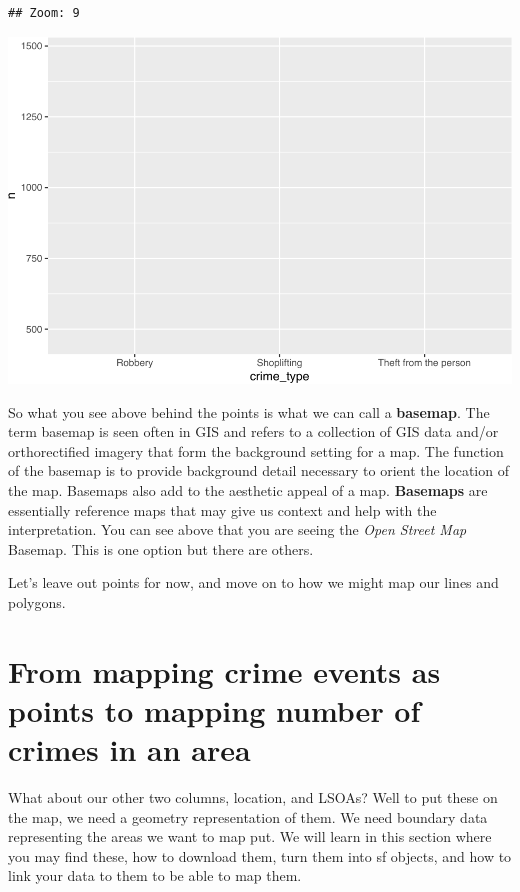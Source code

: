 \documentclass[
]{book}
\begin{document}
\begin{verbatim}
## Zoom: 9
\end{verbatim}

\includegraphics{crime_mapping_files/figure-latex/unnamed-chunk-8-1.pdf}

So what you see above behind the points is what we can call a \textbf{basemap}. The term basemap is seen often in GIS and refers to a collection of GIS data and/or orthorectified imagery that form the background setting for a map. The function of the basemap is to provide background detail necessary to orient the location of the map. Basemaps also add to the aesthetic appeal of a map. \textbf{Basemaps} are essentially reference maps that may give us context and help with the interpretation. You can see above that you are seeing the \emph{Open Street Map} Basemap. This is one option but there are others.

Let's leave out points for now, and move on to how we might map our lines and polygons.

\hypertarget{from-mapping-crime-events-as-points-to-mapping-number-of-crimes-in-an-area}{%
\section{From mapping crime events as points to mapping number of crimes in an area}\label{from-mapping-crime-events-as-points-to-mapping-number-of-crimes-in-an-area}}

What about our other two columns, location, and LSOAs? Well to put these on the map, we need a geometry representation of them. We need boundary data representing the areas we want to map put. We will learn in this section where you may find these, how to download them, turn them into sf objects, and how to link your data to them to be able to map them.
\end{document}
